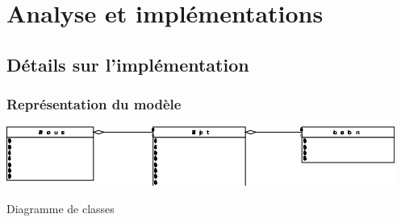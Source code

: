 \part{Analyse et implémentations}
\chapter{Détails sur l'implémentation}
\section{Représentation du modèle}
\begin{img}
  \includegraphics{img/DiagrammeDeClasse.png}
  \caption{Diagramme de classes}
\end{img}